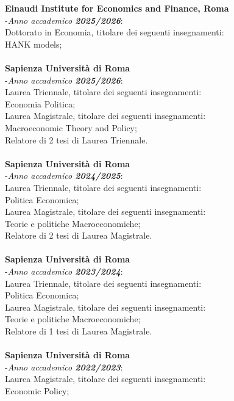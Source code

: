 \documentclass[10p]{article}
\begin{document}
{\bf Einaudi Institute for Economics and Finance, Roma}\\
-\emph{Anno accademico \textbf{2025/2026}}: \\
Dottorato in Economia, titolare dei seguenti insegnamenti:\\
HANK models;\\
\\
{\bf Sapienza Universit\`{a} di Roma}\\
-\emph{Anno accademico \textbf{2025/2026}}: \\
Laurea Triennale, titolare dei seguenti insegnamenti:\\
Economia Politica;\\
Laurea Magistrale, titolare dei seguenti insegnamenti:\\
Macroeconomic Theory and Policy;\\
Relatore di 2 tesi di Laurea Triennale.\\
\\
{\bf Sapienza Universit\`{a} di Roma}\\
-\emph{Anno accademico \textbf{2024/2025}}: \\
Laurea Triennale, titolare dei seguenti insegnamenti:\\
Politica Economica;\\
Laurea Magistrale, titolare dei seguenti insegnamenti:\\
Teorie e politiche Macroeconomiche;\\
Relatore di 2 tesi di Laurea Magistrale.\\
\\
{\bf Sapienza Universit\`{a} di Roma}\\
-\emph{Anno accademico \textbf{2023/2024}}: \\
Laurea Triennale, titolare dei seguenti insegnamenti:\\
Politica Economica;\\
Laurea Magistrale, titolare dei seguenti insegnamenti:\\
Teorie e politiche Macroeconomiche;\\
Relatore di 1 tesi di Laurea Magistrale.\\
\\
{\bf Sapienza Universit\`{a} di Roma}\\
-\emph{Anno accademico \textbf{2022/2023}}: \\
Laurea Magistrale, titolare dei seguenti insegnamenti:\\
Economic Policy;\\
\\
\end{document}
